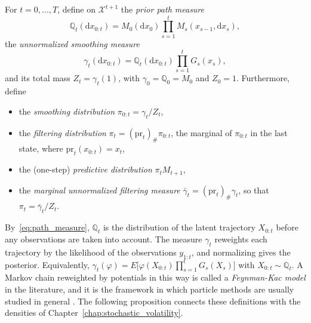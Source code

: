 \begin{definition}
    \label{def:path_measures}
    For $t=0,\ldots,T$, define on $\mathcal{X}^{t+1}$ the \emph{prior path measure}
    \begin{equation}
        \mathbb{Q}_t(\mathrm{d}x_{0:t}) = M_0(\mathrm{d}x_0)\prod_{s=1}^{t}M_s(x_{s-1},\mathrm{d}x_s),
    \end{equation}
    the \emph{unnormalized smoothing measure}
    \begin{equation}
        \gamma_t(\mathrm{d}x_{0:t}) = \mathbb{Q}_t(\mathrm{d}x_{0:t})\prod_{s=1}^{t}G_s(x_s),
    \end{equation}
    and its total mass $Z_t = \gamma_t(1)$, with $\gamma_0 = \mathbb{Q}_0 = M_0$ and $Z_0 = 1$. Furthermore, define
    \begin{itemize}
        \item the \emph{smoothing distribution} $\pi_{0:t} = \gamma_t/Z_t$,
        \item the \emph{filtering distribution} $\pi_t = (\mathrm{pr}_t)_\#\pi_{0:t}$, the marginal of $\pi_{0:t}$ in the last state, where $\mathrm{pr}_t(x_{0:t}) = x_t$,
        \item the (one-step) \emph{predictive distribution} $\pi_tM_{t+1}$,
        \item the \emph{marginal unnormalized filtering measure} $\bar{\gamma}_t = (\mathrm{pr}_t)_\#\gamma_t$, so that $\pi_t = \bar{\gamma}_t/Z_t$.
    \end{itemize}
\end{definition}

By~\eqref{eq:path_measure}, $\mathbb{Q}_t$ is the distribution of the latent trajectory $X_{0:t}$ before any observations are taken into account. The measure $\gamma_t$ reweights each trajectory by the likelihood of the observations $y_{1:t}$, and normalizing gives the posterior. Equivalently, $\gamma_t(\varphi) = E\bigl[\varphi(X_{0:t})\prod_{s=1}^{t}G_s(X_s)\bigr]$ with $X_{0:t}\sim\mathbb{Q}_t$. A Markov chain reweighted by potentials in this way is called a \emph{Feynman-Kac model} in the literature, and it is the framework in which particle methods are usually studied in general \cite{chopin2020smc}. The following proposition connects these definitions with the densities of Chapter~\ref{chap:stochastic_volatility}.

